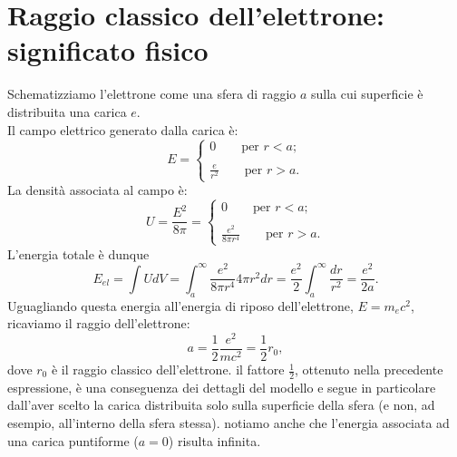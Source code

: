 \documentclass[a4paper,12pt,oneside]{book}
\begin{document}
\section[Raggio classico dell'elettrone]{Raggio classico dell'elettrone: significato fisico}
Schematizziamo l'elettrone come una sfera di raggio $a$ sulla cui superficie è distribuita una carica $e$.\\
Il campo elettrico generato dalla carica è:
\begin{equation}
E=\begin{cases}
0 \qquad \textrm{per }r<a;\\
\\
\displaystyle{\frac{e}{r^2}} \qquad \textrm{per }r>a.
\end{cases}
\end{equation}
La densità associata al campo è:
\begin{equation}
U=\frac{E^2}{8\pi}=\begin{cases}
0 \qquad \textrm{per }r<a;\\
\\
\displaystyle{\frac{e^2}{8\pi r^4}} \qquad \textrm{per }r>a.
\end{cases}
\end{equation}
L'energia totale è dunque
\begin{equation}
E_{el}=\int U dV = \int _a ^{\infty} \frac{e^2}{8\pi r^4} 4\pi r^2 dr = \frac{e^2}{2} \int _a ^{\infty} \frac{dr}{r^2}=\frac{e^2}{2a}. 
\end{equation}
Uguagliando questa energia all'energia di riposo dell'elettrone, $E=m_e c^2$, ricaviamo il raggio dell'elettrone:
\begin{equation}
a=\frac{1}{2}\frac{e^2}{mc^2}=\frac{1}{2} r_0,
\end{equation}
dove $r_0$ è il raggio classico dell'elettrone. il fattore $\frac{1}{2}$, ottenuto nella precedente espressione, è una conseguenza dei dettagli del modello e segue in particolare dall'aver scelto la carica distribuita solo sulla superficie della sfera (e non, ad esempio, all'interno della sfera stessa). notiamo anche che l'energia associata ad una carica puntiforme ($a=0$) risulta infinita.
\end{document}
